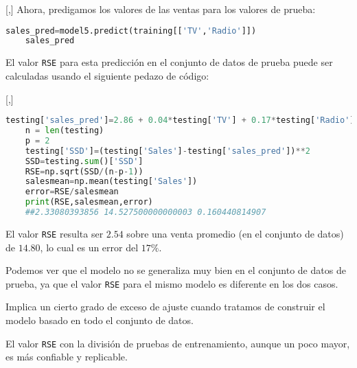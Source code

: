[,]{}
Ahora, predigamos los valores de las ventas para los valores de prueba:

\begin{lstlisting}[language=Python]
	sales_pred=model5.predict(training[['TV','Radio']])
	sales_pred
\end{lstlisting}


El valor \texttt{RSE} para esta predicción en el conjunto de datos de prueba puede ser calculadas usando el siguiente pedazo de código:

[,]{}
\begin{lstlisting}[language=Python]
	testing['sales_pred']=2.86 + 0.04*testing['TV'] + 0.17*testing['Radio']
	n = len(testing)
	p = 2
	testing['SSD']=(testing['Sales']-testing['sales_pred'])**2
	SSD=testing.sum()['SSD']
	RSE=np.sqrt(SSD/(n-p-1))
	salesmean=np.mean(testing['Sales'])
	error=RSE/salesmean
	print(RSE,salesmean,error)
	##2.33080393856 14.527500000000003 0.160440814907
\end{lstlisting}


El valor \texttt{RSE} resulta ser $2.54$ sobre una venta promedio (en el conjunto de datos) de $14.80$, lo cual es un error del $17\%$.


Podemos ver que el modelo no se generaliza muy bien en el conjunto de datos de prueba, ya que el valor \texttt{RSE} para el mismo modelo es diferente en los dos casos.


Implica un cierto grado de exceso de ajuste cuando tratamos de construir el modelo basado en todo el conjunto de datos.


El valor \texttt{RSE} con
la división de pruebas de entrenamiento, aunque un poco mayor, es más confiable y replicable.
